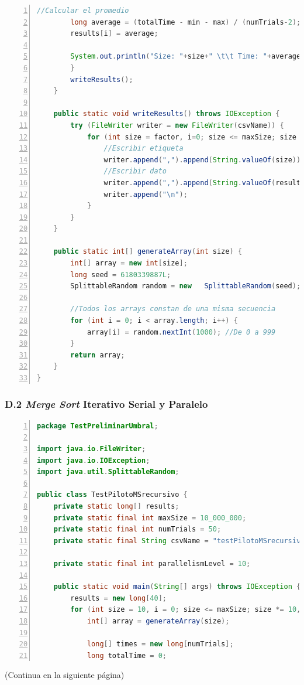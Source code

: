 \documentclass[titlepage]{article}
\begin{document}
\newpage
\begin{lstlisting}[language=java, frame=single,numbers=left, float=h!, breaklines=true]
		//Calcular el promedio
		long average = (totalTime - min - max) / (numTrials-2);
		results[i] = average;
		
		System.out.println("Size: "+size+" \t\t Time: "+average);
		}
		writeResults();
	}
	
	public static void writeResults() throws IOException {
		try (FileWriter writer = new FileWriter(csvName)) {
			for (int size = factor, i=0; size <= maxSize; size *= factor, i++) {
				//Escribir etiqueta
				writer.append(",").append(String.valueOf(size));
				//Escribir dato
				writer.append(",").append(String.valueOf(results[i]));
				writer.append("\n");
			}
		}
	}

	public static int[] generateArray(int size) {
		int[] array = new int[size];
		long seed = 6180339887L;
		SplittableRandom random = new 	SplittableRandom(seed);
		
		//Todos los arrays constan de una misma secuencia
		for (int i = 0; i < array.length; i++) {
			array[i] = random.nextInt(1000); //De 0 a 999
		}
		return array;
	}
}	
\end{lstlisting}

\subsubsection*{D.2 \textit{Merge Sort} Iterativo Serial y Paralelo}
\begin{lstlisting}[language=java, frame=single,numbers=left, float=h!, breaklines=true]
package TestPreliminarUmbral;

import java.io.FileWriter;
import java.io.IOException;
import java.util.SplittableRandom;

public class TestPilotoMSrecursivo {
	private static long[] results;
	private static final int maxSize = 10_000_000;
	private static final int numTrials = 50;
	private static final String csvName = "testPilotoMSrecursivo.csv";
	
	private static final int parallelismLevel = 10;
	
	public static void main(String[] args) throws IOException {
		results = new long[40];
		for (int size = 10, i = 0; size <= maxSize; size *= 10, i++) {
			int[] array = generateArray(size);
			
			long[] times = new long[numTrials];
			long totalTime = 0;
\end{lstlisting}
(Continua en la siguiente página)
\end{document}
